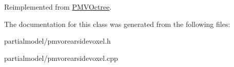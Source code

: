 Reimplemented from \hyperlink{classPMVOctree_a7f3ca384e40ac57446ec20d9acbefa92}{P\+M\+V\+Octree}.



The documentation for this class was generated from the following files\+:\begin{DoxyCompactItemize}
\item 
partialmodel/pmvorearsidevoxel.\+h\item 
partialmodel/pmvorearsidevoxel.\+cpp\end{DoxyCompactItemize}
